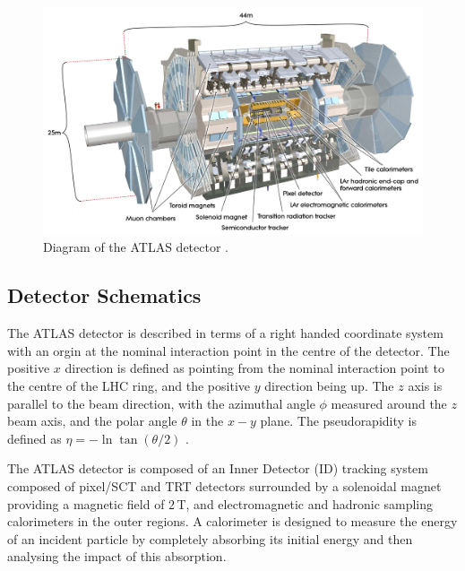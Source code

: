 \documentclass{article}
\begin{document}
\begin{figure}[h]
    \centering
    \includegraphics[scale=0.075]{images/AtlasDetector.jpg}
    \caption{ Diagram of the ATLAS detector \cite{ATLASReview}. \label{fig:ATLASDiagram} }
\end{figure}

\subsection{Detector Schematics}
\label{sec:ATLAS_DetectorSchematics}

The ATLAS detector is described in terms of a right handed coordinate system with an orgin at the nominal interaction point in the centre of the detector. The positive $x$ direction is defined as pointing from the nominal interaction point to the centre of the LHC ring, and the positive $y$ direction being up. The $z$ axis is parallel to the beam direction, with the azimuthal angle $\phi$ measured around the $z$ beam axis, and the polar angle $\theta$ in the $x-y$ plane. The pseudorapidity is defined as $\eta = -\ln\tan(\theta/2)$ \cite{ATLASReview}.

The ATLAS detector is composed of an Inner Detector (ID) tracking system composed of pixel/SCT and TRT detectors surrounded by a solenoidal magnet providing a magnetic field of $2\,$T, and electromagnetic and hadronic sampling calorimeters in the outer regions. A calorimeter is designed to measure the energy of an incident particle by completely absorbing its initial energy and then analysing the impact of this absorption.
\end{document}
